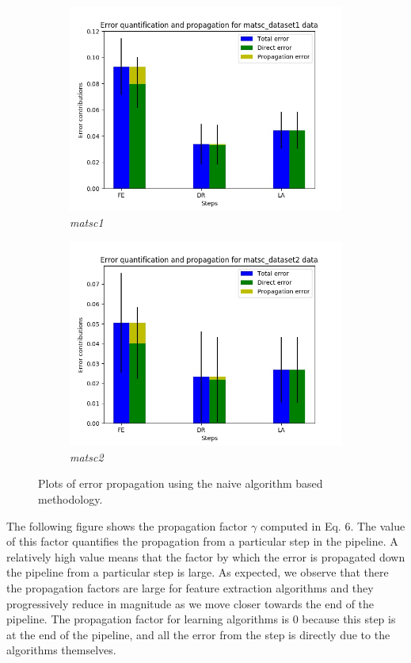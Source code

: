 \begin{figure}[H]
\begin{subfigure}{.5\textwidth}
  \includegraphics[scale=0.4]{img/EP/error_propagation_random_pipeline_matsc_dataset1}
  \caption{\textit{matsc1}}
  \label{fig:sfig3}
\end{subfigure}%
\begin{subfigure}{.5\textwidth}
  \centering
  \includegraphics[scale=0.4]{img/EP/error_propagation_random_pipeline_matsc_dataset2}
  \caption{\textit{matsc2}}
  \label{fig:sfig4}
\end{subfigure}

\caption{Plots of error propagation using the naive algorithm based methodology.}
\label{fig:fig}
\end{figure}

The following figure shows the propagation factor $\gamma$ computed in Eq. 6. The value of this factor quantifies the propagation from a particular step in the pipeline. A relatively high value means that the factor by which the error is propagated down the pipeline from a particular step is large. As expected, we observe that there the propagation factors are large for feature extraction algorithms and they progressively reduce in magnitude as we move closer towards the end of the pipeline. The propagation factor for learning algorithms is $0$ because this step is at the end of the pipeline, and all the error from the step is directly due to the algorithms themselves.

